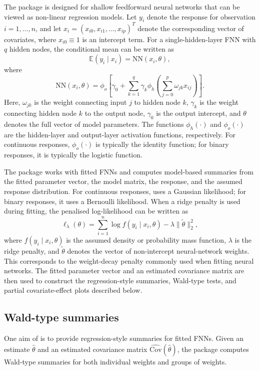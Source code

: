 The  package is designed for shallow feedforward neural networks that can be viewed as non-linear regression models.
Let \(y_i\) denote the response for observation \(i = 1,\dots,n\), and let \(x_i = (x_{i0}, x_{i1}, \dots, x_{ip})^T\) denote the corresponding vector of covariates, where \(x_{i0} \equiv 1\) is an intercept term.
For a single-hidden-layer FNN with \(q\) hidden nodes, the conditional mean can be written as
\[
    \mathbb{E}(y_i \mid x_i) = \mathrm{NN}(x_i, \theta),
\]
where
\[
  \mathrm{NN}(x_i, \theta) =
  \phi_o \left[
    \gamma_0 +
    \sum_{k=1}^q \gamma_k
    \phi_h \left(
      \sum_{j=0}^p \omega_{jk} x_{ij}
    \right)
  \right].
\]
Here, \(\omega_{jk}\) is the weight connecting input \(j\) to hidden node \(k\), \(\gamma_k\) is the weight connecting hidden node \(k\) to the output node, \(\gamma_0\) is the output intercept, and \(\theta\) denotes the full vector of model parameters.
The functions \(\phi_h(\cdot)\) and \(\phi_o(\cdot)\) are the hidden-layer and output-layer activation functions, respectively.
For continuous responses, \(\phi_o(\cdot)\) is typically the identity function; for binary responses, it is typically the logistic function.

The package works with fitted FNNs and computes model-based summaries from the fitted parameter vector, the model matrix, the response, and the assumed response distribution.
For continuous responses,  uses a Gaussian likelihood; for binary responses, it uses a Bernoulli likelihood.
When a ridge penalty is used during fitting, the penalised log-likelihood can be written as
\[
  \ell_\lambda(\theta)
  =
  \sum_{i=1}^n \log f(y_i \mid x_i, \theta)
  -
  \lambda \lVert \tilde{\theta} \rVert_2^2,
\]
where \(f(y_i \mid x_i, \theta)\) is the assumed density or probability mass function, \(\lambda\) is the ridge penalty, and \(\tilde{\theta}\) denotes the vector of non-intercept neural-network weights.
This corresponds to the weight-decay penalty commonly used when fitting neural networks.
The fitted parameter vector and an estimated covariance matrix are then used to construct the regression-style summaries, Wald-type tests, and partial covariate-effect plots described below.

\subsection{Wald-type summaries}\label{wald-type-summaries}

One aim of  is to provide regression-style summaries for fitted FNNs.
Given an estimate \(\hat{\theta}\) and an estimated covariance matrix \(\widehat{\mathrm{Cov}}(\hat{\theta})\), the package computes Wald-type summaries for both individual weights and groups of weights.

